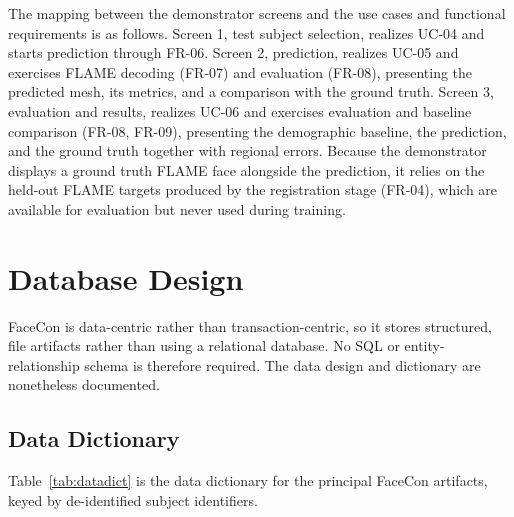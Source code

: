 The mapping between the demonstrator screens and the use cases and functional requirements is as follows. Screen 1, test subject selection, realizes UC-04 and starts prediction through FR-06. Screen 2, prediction, realizes UC-05 and exercises FLAME decoding (FR-07) and evaluation (FR-08), presenting the predicted mesh, its metrics, and a comparison with the ground truth. Screen 3, evaluation and results, realizes UC-06 and exercises evaluation and baseline comparison (FR-08, FR-09), presenting the demographic baseline, the prediction, and the ground truth together with regional errors. Because the demonstrator displays a ground truth FLAME face alongside the prediction, it relies on the held-out FLAME targets produced by the registration stage (FR-04), which are available for evaluation but never used during training.

\section{Database Design}
FaceCon is data-centric rather than transaction-centric, so it stores structured, file artifacts rather than using a relational database. No SQL or entity-relationship schema is therefore required. The data design and dictionary are nonetheless documented.

\subsection{Data Dictionary}
Table~\ref{tab:datadict} is the data dictionary for the principal FaceCon artifacts, keyed by de-identified subject identifiers.

